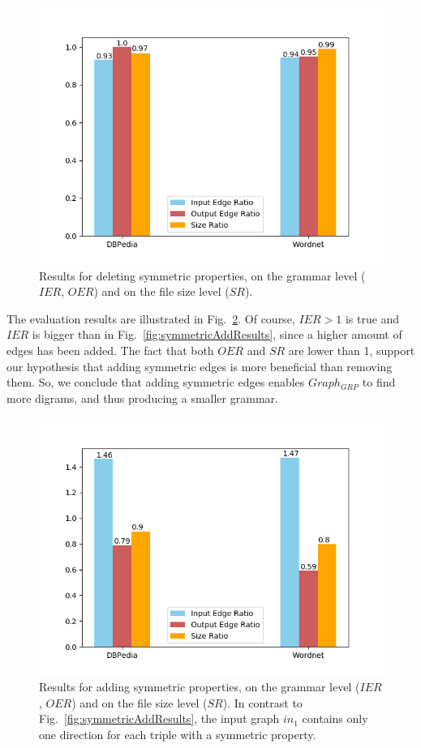 \begin{figure}
	\centering
	\includegraphics[width=0.8\linewidth]{figures/4_evaluation/ontology/ratiosSymmetricsDelete}
	\caption{Results for deleting symmetric properties, on the grammar level ($IER$, $OER$) and on the file size level ($SR$).}
	\label{fig:symmetricDeleteResults}
\end{figure}



The evaluation results are illustrated in Fig.~\ref{fig:symmetricAddResults2}. Of course, $IER>1$ is true and $IER$ is bigger than in Fig.~\ref{fig:symmetricAddResults}, since a higher amount of edges has been added. The fact that both $OER$ and $SR$ are lower than 1, support our hypothesis that adding symmetric edges is more beneficial than removing them. So, we conclude that adding symmetric edges enables $Graph_{GRP}$ to find more digrams, and thus producing a smaller grammar.

\begin{figure}
	\centering
	\includegraphics[width=0.8\linewidth]{figures/4_evaluation/ontology/ratiosSymmetricsAdd2}
	\caption{Results for adding symmetric properties, on the grammar level ($IER$, $OER$) and on the file size level ($SR$). In contrast to Fig.~\ref{fig:symmetricAddResults}, the input graph $in_1$ contains only one direction for each triple with a symmetric property.}
	\label{fig:symmetricAddResults2}
\end{figure}



